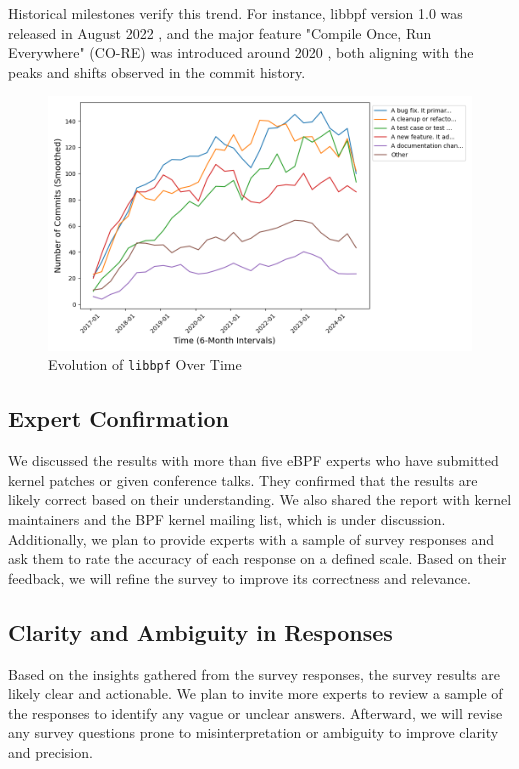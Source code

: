 Historical milestones verify this trend. For instance, libbpf version 1.0 was released in August 2022 \cite{libbpf1}, and the major feature "Compile Once, Run Everywhere" (CO-RE) was introduced around 2020 \cite{core}, both aligning with the peaks and shifts observed in the commit history.


\begin{figure}[ht]
    \centering
    \includegraphics[width=\linewidth]{feature-analysis/timeline_libbpf_commit_classification_smoothed.png}
    \caption{Evolution of \texttt{libbpf} Over Time}
    \label{fig:libbpf_commit_classification}
\end{figure}

\subsection{Expert Confirmation} 

We discussed the results with more than five eBPF experts who have submitted kernel patches or given conference talks. They confirmed that the results are likely correct based on their understanding. We also shared the report with kernel maintainers and the BPF kernel mailing list, which is under discussion. Additionally, we plan to provide experts with a sample of survey responses and ask them to rate the accuracy of each response on a defined scale. Based on their feedback, we will refine the survey to improve its correctness and relevance.

\subsection{Clarity and Ambiguity in Responses}

Based on the insights gathered from the survey responses, the survey results are likely clear and  actionable. We plan to invite more experts to review a sample of the responses to identify any vague or unclear answers. Afterward, we will revise any survey questions prone to misinterpretation or ambiguity to improve clarity and precision.

